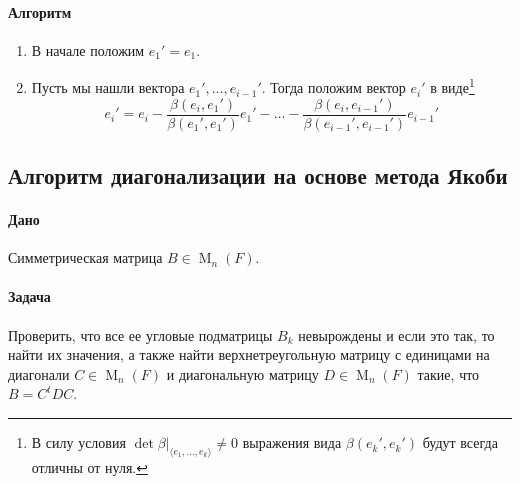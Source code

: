 \documentclass{article}
\begin{document}
\paragraph{Алгоритм}
\begin{enumerate}
\item В начале положим $e_1' = e_1$.

\item Пусть мы нашли вектора $e_1',\ldots,e_{i - 1}'$.  Тогда положим вектор $e_i' $ в виде\footnote{В силу условия $\det \beta|_{\langle e_1,\ldots,e_k\rangle}\neq 0$ выражения вида $\beta(e_k',e_k')$ будут всегда отличны от нуля.}
\[
e_i' = e_i - \frac{\beta(e_i, e_1')}{\beta(e_1',e_1')} e_1' - \ldots - \frac{\beta(e_i, e_{i-1}')}{\beta(e_{i-1}', e_{i-1}')}e_{i-1}'
\]
\end{enumerate}

\subsection{Алгоритм диагонализации на основе метода Якоби}

\paragraph{Дано} Симметрическая матрица $B\in \operatorname{M}_n(F)$.

\paragraph{Задача} Проверить, что все ее угловые подматрицы $B_k$ невырождены и если это так, то найти их значения, а также найти верхнетреугольную матрицу с единицами на диагонали $C\in \operatorname{M}_n(F)$ и диагональную матрицу $D\in\operatorname{M}_n(F)$ такие, что $B = C^t D C$.
\end{document}
